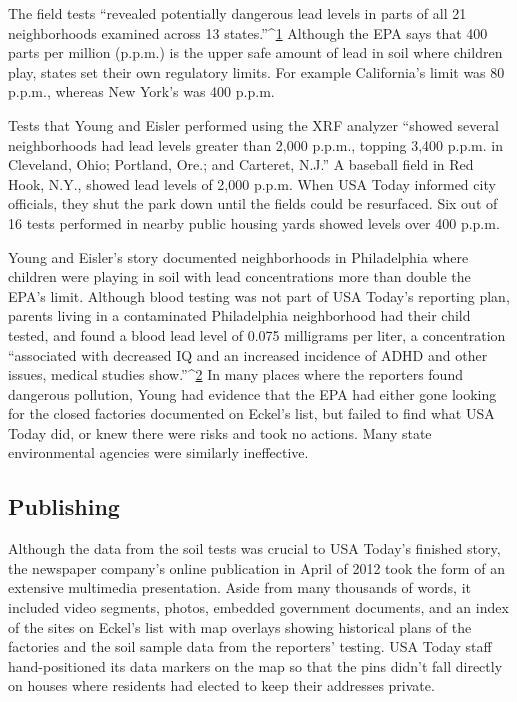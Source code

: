 The field tests ``revealed potentially dangerous lead levels in parts of all 21
neighborhoods examined across 13 states.''^{\href{#endnotes-usa-today}{1}} Although the EPA says that 400
parts per million (p.p.m.) is the upper safe amount of lead in soil where children
play, states set their own regulatory limits. For example California's
limit was 80 p.p.m., whereas New York's was 400 p.p.m.

Tests that Young and Eisler performed using the XRF analyzer ``showed several
neighborhoods had lead levels greater than 2,000 p.p.m., topping 3,400
p.p.m. in Cleveland, Ohio; Portland, Ore.; and Carteret, N.J.'' A baseball field
in Red Hook, N.Y., showed lead levels of 2,000 p.p.m. When USA Today
informed city officials, they shut the park down until the fields could be
resurfaced. Six out of 16 tests performed in nearby public housing yards
showed levels over 400 p.p.m.

Young and Eisler's story documented neighborhoods in Philadelphia where
children were playing in soil with lead concentrations more than double the
EPA's limit. Although blood testing was not part of USA Today's reporting
plan, parents living in a contaminated Philadelphia neighborhood had their
child tested, and found a blood lead level of 0.075 milligrams per liter, a
concentration ``associated with decreased IQ and an increased incidence of
ADHD and other issues, medical studies show.''^{\href{#endnotes-usa-today}{2}} In many places where the
reporters found dangerous pollution, Young had evidence that the EPA had
either gone looking for the closed factories documented on Eckel's list, but
failed to find what USA Today did, or knew there were risks and took no
actions. Many state environmental agencies were similarly ineffective.

\subsection{Publishing}
Although the data from the soil tests was crucial to USA Today's finished
story, the newspaper company's online publication in April of 2012 took the
form of an extensive multimedia presentation. Aside from many thousands
of words, it included video segments, photos, embedded government documents,
and an index of the sites on Eckel's list with map overlays showing
historical plans of the factories and the soil sample data from the reporters'
testing. USA Today staff hand-positioned its data markers on the map so
that the pins didn't fall directly on houses where residents had elected to
keep their addresses private.

